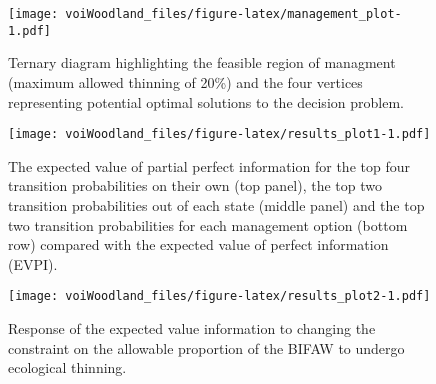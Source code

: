 \documentclass[]{article}
\begin{document}
\begin{figure}[htbp]
\centering
\texttt{[image: voiWoodland\_files/figure-latex/management\_plot-1.pdf]}
\caption{Ternary diagram highlighting the feasible region of managment
(maximum allowed thinning of 20\%) and the four vertices representing
potential optimal solutions to the decision problem.}
\end{figure}

\begin{figure}[htbp]
\centering
\texttt{[image: voiWoodland\_files/figure-latex/results\_plot1-1.pdf]}
\caption{The expected value of partial perfect information for the top
four transition probabilities on their own (top panel), the top two
transition probabilities out of each state (middle panel) and the top
two transition probabilities for each management option (bottom row)
compared with the expected value of perfect information (EVPI).}
\end{figure}

\begin{figure}[htbp]
\centering
\texttt{[image: voiWoodland\_files/figure-latex/results\_plot2-1.pdf]}
\caption{Response of the expected value information to changing the
constraint on the allowable proportion of the BIFAW to undergo
ecological thinning.}
\end{figure}

\renewcommand\refname{Literature cited}

\end{document}
